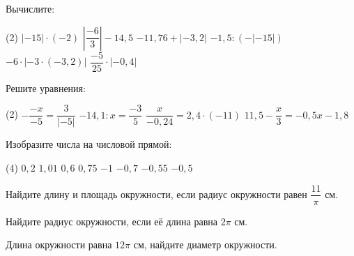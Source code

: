 \begin{homework}[number=3]
	\begin{listofex}
		\item Вычислите:
		\begin{tasks}(2)
			\task \( |-15| \cdot (-2) \)
			\task \( \left| \dfrac{ -6 }{ 3 } \right|-14,5  \)
			\task \( -11,76 + |-3,2| \)
			\task \( -1,5 : (-|-15|) \)
			\task \( -6 \cdot |-3 \cdot (-3,2)| \)
			\task \( \dfrac{ -5 }{ 25 } \cdot |-0,4| \)
		\end{tasks}
		\item Решите уравнения:
		\begin{tasks}(2)
			\task \( -\dfrac{-x}{-5}=\dfrac{3}{|-5|} \)
			\task \( -14,1:x=\dfrac{-3}{5} \)
			\task \( \dfrac{x}{-0,24}=2,4 \cdot (-11) \)
			\task \( 11,5-\dfrac{x}{3}=-0,5x-1,8 \)
		\end{tasks}
		\item Изобразите числа на числовой прямой:
		\begin{tasks}(4)
			\task \( 0,2 \)
			\task \( 1,01 \)
			\task \( 0,6 \)
			\task \( 0,75 \)
			\task \( -1 \)
			\task \( -0,7 \)
			\task \( -0,55 \)
			\task \( -0,5 \)
		\end{tasks}
		\item Найдите длину и площадь окружности, если радиус окружности равен \( \dfrac{11}{\pi} \) см.
		\item Найдите радиус окружности, если её длина равна \( 2\pi \) см.
		\item Длина окружности равна \(12\pi\) см, найдите диаметр окружности.
	\end{listofex}
\end{homework}

